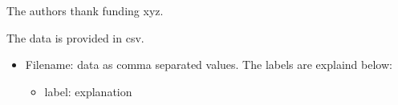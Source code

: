 \documentclass[journal=jctcce,manuscript=article, layout=onecolumn]{achemso}
\begin{document}
\begin{acknowledgement}
The authors thank funding xyz.
\end{acknowledgement}

\begin{suppinfo}
The data is provided in csv.
\begin{itemize}
  \item Filename: data as comma separated values. The labels are explaind below:
  \begin{itemize}
   \item label: explanation
  \end{itemize}


\end{itemize}

\end{suppinfo}


\end{document}

